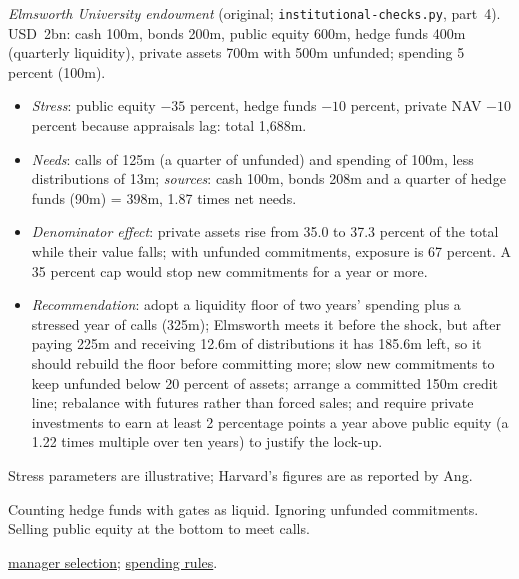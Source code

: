\begin{qfmethod}
 \emph{Elmsworth University endowment} (original; \texttt{institutional-checks.py}, part~4). USD~2bn: cash 100m, bonds 200m, public equity 600m, hedge funds 400m (quarterly liquidity), private assets 700m with 500m unfunded; spending 5 percent (100m).
\begin{itemize}
\item \emph{Stress}: public equity $-35$ percent, hedge funds $-10$ percent, private NAV $-10$ percent because appraisals lag: total 1,688m.
\item \emph{Needs}: calls of 125m (a quarter of unfunded) and spending of 100m, less distributions of 13m; \emph{sources}: cash 100m, bonds 208m and a quarter of hedge funds (90m) = 398m, 1.87 times net needs.
\item \emph{Denominator effect}: private assets rise from 35.0 to 37.3 percent of the total while their value falls; with unfunded commitments, exposure is 67 percent. A 35 percent cap would stop new commitments for a year or more.
\item \emph{Recommendation}: adopt a liquidity floor of two years' spending plus a stressed year of calls (325m); Elmsworth meets it before the shock, but after paying 225m and receiving 12.6m of distributions it has 185.6m left, so it should rebuild the floor before committing more; slow new commitments to keep unfunded below 20 percent of assets; arrange a committed 150m credit line; rebalance with futures rather than forced sales; and require private investments to earn at least 2 percentage points a year above public equity (a 1.22 times multiple over ten years) to justify the lock-up.
\end{itemize}

 Stress parameters are illustrative; Harvard's figures are as reported by Ang.

 Counting hedge funds with gates as liquid. Ignoring unfunded commitments. Selling public equity at the bottom to meet calls.

 \hyperref[meth:standards-in-manager-selection]{manager selection}; \hyperref[meth:institutional-ips-portfolios]{spending rules}.

\end{qfmethod}

